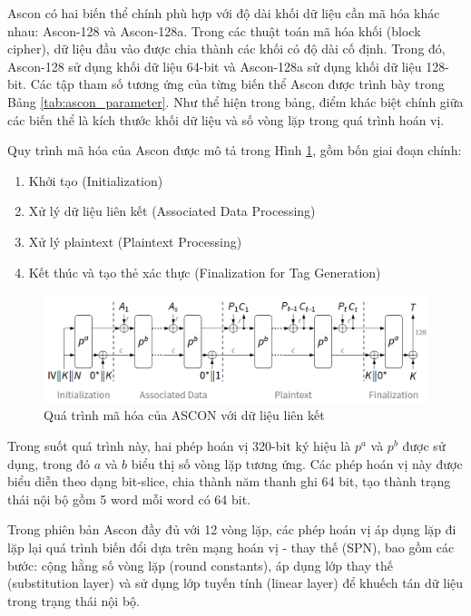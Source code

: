 Ascon có hai biến thể chính phù hợp với độ dài khối dữ liệu cần mã hóa khác nhau: Ascon-128 và Ascon-128a. Trong các thuật toán mã hóa khối (block cipher), dữ liệu đầu vào được chia thành các khối có độ dài cố định. Trong đó, Ascon-128 sử dụng khối dữ liệu 64-bit và Ascon-128a sử dụng khối dữ liệu 128-bit. Các tập tham số tương ứng của từng biến thể Ascon được trình bày trong Bảng \ref{tab:ascon_parameter}. Như thể hiện trong bảng, điểm khác biệt chính giữa các biến thể là kích thước khối dữ liệu và số vòng lặp trong quá trình hoán vị.

Quy trình mã hóa của Ascon được mô tả trong Hình \ref{fig:ascon_process}, gồm bốn giai đoạn chính:
\begin{enumerate}
    \item Khởi tạo (Initialization)
    \item Xử lý dữ liệu liên kết (Associated Data Processing)
    \item Xử lý plaintext (Plaintext Processing)
    \item Kết thúc và tạo thẻ xác thực (Finalization for Tag Generation)
\end{enumerate}

\begin{figure}
    \centering
    \includegraphics[width=0.9\linewidth]{ascon_process.png}
    \caption{Quá trình mã hóa của ASCON với dữ liệu liên kết}
    \label{fig:ascon_process}
\end{figure}

Trong suốt quá trình này, hai phép hoán vị 320-bit ký hiệu là $p^a$ và $p^b$ được sử dụng, trong đó $a$ và $b$ biểu thị số vòng lặp tương ứng. Các phép hoán vị này được biểu diễn theo dạng bit-slice, chia thành năm thanh ghi 64 bit, tạo thành trạng thái nội bộ gồm 5 word mỗi word có 64 bit.

Trong phiên bản Ascon đầy đủ với 12 vòng lặp, các phép hoán vị áp dụng lặp đi lặp lại quá trình biến đổi dựa trên mạng hoán vị - thay thế (SPN), bao gồm các bước: cộng hằng số vòng lặp (round constants), áp dụng lớp thay thế (substitution layer) và sử dụng lớp tuyến tính (linear layer) để khuếch tán dữ liệu trong trạng thái nội bộ.

